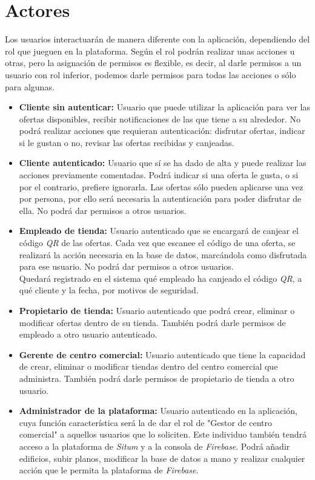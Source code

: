 \section{Actores}
Los usuarios interactuarán de manera diferente con la aplicación, dependiendo del rol que jueguen en la plataforma. Según el rol podrán realizar unas acciones u otras, pero la asignación de permisos es flexible, es decir, al darle permisos a un usuario con rol inferior, podemos darle permisos para todas las acciones o sólo para algunas.
\begin{itemize}
\item \textbf{Cliente sin autenticar:} Usuario que puede utilizar la aplicación para ver las ofertas disponibles, recibir notificaciones de las que tiene a su alrededor. No podrá realizar acciones que requieran autenticación: disfrutar ofertas, indicar si le gustan o no, revisar las ofertas recibidas y canjeadas.
\item \textbf{Cliente autenticado:} Usuario que sí se ha dado de alta y puede realizar las acciones previamente comentadas. Podrá indicar si una oferta le gusta, o si por el contrario, prefiere ignorarla. Las ofertas sólo pueden aplicarse una vez por persona, por ello será necesaria la autenticación para poder disfrutar de ella. No podrá dar permisos a otros usuarios.
\item \textbf{Empleado de tienda:} Usuario autenticado que se encargará de canjear el código \textit{QR} de las ofertas. Cada vez que escanee el código de una oferta, se realizará la acción necesaria en la base de datos, marcándola como disfrutada para ese usuario. No podrá dar permisos a otros usuarios.\\
Quedará registrado en el sistema qué empleado ha canjeado el código \textit{QR}, a qué cliente y la fecha, por motivos de seguridad.
\item \textbf{Propietario de tienda:} Usuario autenticado que podrá crear, eliminar o modificar ofertas dentro de su tienda. También podrá darle permisos de empleado a otro usuario autenticado.
\item \textbf{Gerente de centro comercial:} Usuario autenticado que tiene la capacidad de crear, eliminar o modificar tiendas dentro del centro comercial que administra. También podrá darle permisos de propietario de tienda a otro usuario.
\item \textbf{Administrador de la plataforma:} Usuario autenticado en la aplicación, cuya función característica será la de dar el rol de "Gestor de centro comercial" a aquellos usuarios que lo soliciten. Este individuo también tendrá acceso a la plataforma de \textit{Situm} y a la consola de \textit{Firebase}. Podrá añadir edificios, subir planos, modificar la base de datos a mano y realizar cualquier acción que le permita la plataforma de \textit{Firebase}. 
\end{itemize}
